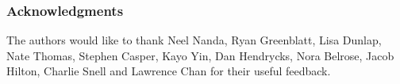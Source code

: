 \documentclass{article} %
\begin{document}
\subsubsection*{Acknowledgments}
The authors would like to thank Neel Nanda, Ryan Greenblatt, Lisa Dunlap, Nate Thomas, Stephen Casper, Kayo Yin, Dan Hendrycks, Nora Belrose, Jacob Hilton, Charlie Snell and Lawrence Chan for their useful feedback.






\end{document}
